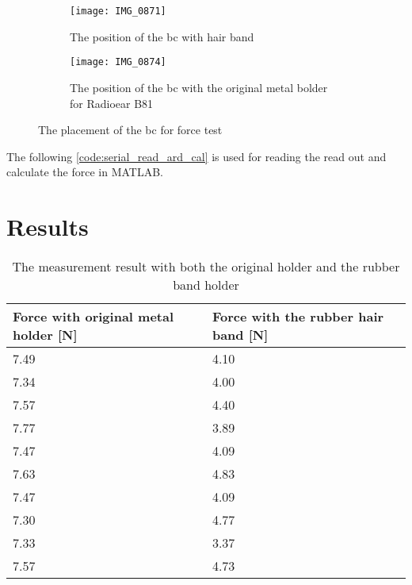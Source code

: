 \begin{figure}[H]
\centering
\begin{subfigure}[htbp]{0.33\textwidth}
		\texttt{[image: IMG\_0871]}
		\caption{The position of the \gls{bc} with hair band}
		\label{fig:bc_hair_band}
\end{subfigure}\vspace{10pt}
\begin{subfigure}[htbp]{0.60\textwidth}
		\texttt{[image: IMG\_0874]}
		\caption{The position of the \gls{bc} with the original metal bolder for Radioear B81}
		\label{fig:bc_metal_holder}
\end{subfigure} \hspace{10pt}
\caption{The placement of the \gls{bc} for force test}
\label{fig:bc_holder}
\end{figure}


The following \autoref{code:serial_read_ard_cal} is used for reading the read out and calculate the force in MATLAB.



\section*{Results}


\begin{table}[H]
\centering
\caption{The measurement result with both the original holder and the rubber band holder}
\label{apend:weight_result}
\begin{tabular}{l|l}
Force with original metal holder [\si{\newton}] & Force with the rubber hair band [\si{\newton}] \\ \hline
7.49                                           & 4.10                                          \\
7.34                                           & 4.00                                          \\
7.57                                           & 4.40                                          \\
7.77                                           & 3.89                                          \\
7.47                                           & 4.09                                          \\
7.63                                           & 4.83                                          \\
7.47                                           & 4.09                                          \\
7.30                                           & 4.77                                          \\
7.33                                           & 3.37                                          \\
7.57                                           & 4.73                                         
\end{tabular}
\end{table}

